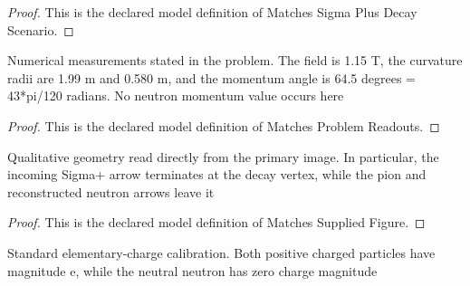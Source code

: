 \begin{proof}
  This is the declared model definition of Matches Sigma Plus Decay Scenario.
\end{proof}
\begin{definition}
  \label{def:physics:phyx-mini-0540:phyxminiproblems-problemphyxmini0540-matchesproblemreadouts}
  Numerical measurements stated in the problem. The field is 1.15 T, the curvature radii are 1.99 m and 0.580 m, and the momentum angle is 64.5 degrees = 43*pi/120 radians. No neutron momentum value occurs here
\end{definition}
\begin{proof}
  This is the declared model definition of Matches Problem Readouts.
\end{proof}
\begin{definition}
  \label{def:physics:phyx-mini-0540:phyxminiproblems-problemphyxmini0540-matchessuppliedfigure}
  Qualitative geometry read directly from the primary image. In particular, the incoming Sigma+ arrow terminates at the decay vertex, while the pion and reconstructed neutron arrows leave it
\end{definition}
\begin{proof}
  This is the declared model definition of Matches Supplied Figure.
\end{proof}
\begin{definition}
  \label{def:physics:phyx-mini-0540:phyxminiproblems-problemphyxmini0540-usesstandardparticlecharges}
  Standard elementary-charge calibration. Both positive charged particles have magnitude e, while the neutral neutron has zero charge magnitude
\end{definition}

